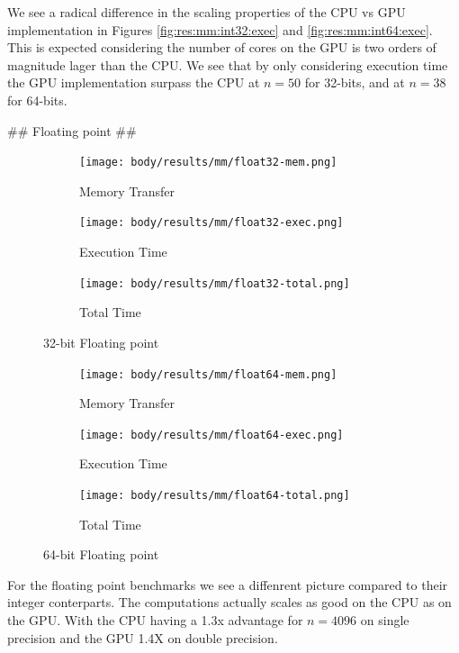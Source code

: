 \begin{markdown}
We see a radical difference in the scaling properties of the CPU vs
GPU implementation in Figures \ref{fig:res:mm:int32:exec} and
\ref{fig:res:mm:int64:exec}. This is expected considering the number
of cores on the GPU is two orders of magnitude lager than the CPU. We
see that by only considering execution time the GPU implementation
surpass the CPU at $n=50$ for 32-bits, and at $n=38$ for 64-bits.

## Floating point ##

\begin{figure}[H]
  \centering
  \begin{subfigure}{.33\textwidth}
    \centering
    \texttt{[image: body/results/mm/float32-mem.png]}
    \caption{Memory Transfer}
    \label{fig:res:mm:float32:mem}
  \end{subfigure}%
  \begin{subfigure}{.33\textwidth}
    \centering
    \texttt{[image: body/results/mm/float32-exec.png]}
    \caption{Execution Time}
    \label{fig:res:mm:float32:exec}
  \end{subfigure}%
  \begin{subfigure}{.33\textwidth}
    \centering
    \texttt{[image: body/results/mm/float32-total.png]}
    \caption{Total Time}
    \label{fig:res:mm:float32:tot}
  \end{subfigure}
  \caption{32-bit Floating point}
  \label{fig:res:mm:float32}
\end{figure}


\begin{figure}[H]
  \centering
  \begin{subfigure}{.33\textwidth}
    \centering
    \texttt{[image: body/results/mm/float64-mem.png]}
    \caption{Memory Transfer}
    \label{fig:res:mm:float64:mem}
  \end{subfigure}%
  \begin{subfigure}{.33\textwidth}
    \centering
    \texttt{[image: body/results/mm/float64-exec.png]}
    \caption{Execution Time}
    \label{fig:res:mm:float64:exec}
  \end{subfigure}%
  \begin{subfigure}{.33\textwidth}
    \centering
    \texttt{[image: body/results/mm/float64-total.png]}
    \caption{Total Time}
    \label{fig:res:mm:float64:tot}
  \end{subfigure}
  \caption{64-bit Floating point}
  \label{fig:res:mm:float64}
\end{figure}

For the floating point benchmarks we see a diffenrent picture compared
to their integer conterparts. The computations actually scales as good
on the CPU as on the GPU. With the CPU having a 1.3x advantage for
$n=4096$ on single precision and the GPU 1.4X on double precision.

\end{markdown}
